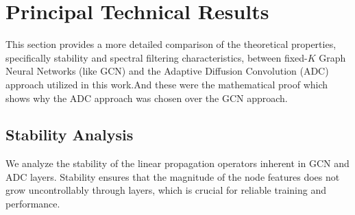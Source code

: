 


\section{Principal Technical Results}
\label{sec:principal_results}

This section provides a more detailed comparison of the theoretical properties, specifically stability and spectral filtering characteristics, between fixed-\(K\) Graph Neural Networks (like GCN) and the Adaptive Diffusion Convolution (ADC) approach utilized in this work.And these were the mathematical proof which shows why the ADC approach was chosen over the GCN approach.

\subsection{Stability Analysis}
We analyze the stability of the linear propagation operators inherent in GCN and ADC layers. Stability ensures that the magnitude of the node features does not grow uncontrollably through layers, which is crucial for reliable training and performance.
\newpage
